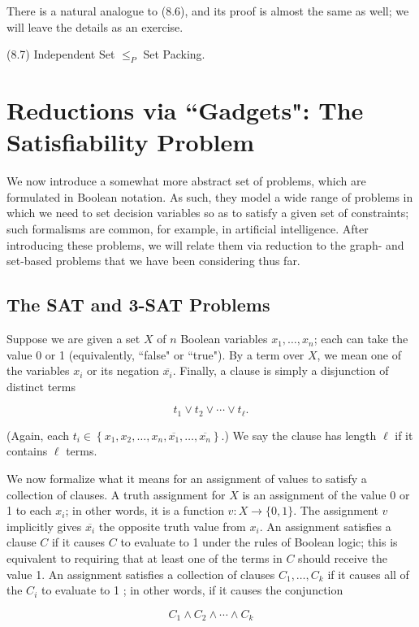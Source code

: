 \documentclass[a4paper, 12pt]{book}
\theoremstyle{dotless}
\begin{document}
There is a natural analogue to (8.6), and its proof is almost the same as well; we will leave the details as an exercise.

(8.7) Independent Set $\leq_{P}$ Set Packing.

\section{Reductions via ``Gadgets": The Satisfiability Problem}
We now introduce a somewhat more abstract set of problems, which are formulated in Boolean notation. As such, they model a wide range of problems in which we need to set decision variables so as to satisfy a given set of constraints; such formalisms are common, for example, in artificial intelligence. After introducing these problems, we will relate them via reduction to the graph- and set-based problems that we have been considering thus far.

\subsection{The SAT and 3-SAT Problems}
Suppose we are given a set $X$ of $n$ Boolean variables $x_{1}, \ldots, x_{n}$; each can take the value 0 or 1 (equivalently, ``false" or ``true"). By a term over $X$, we mean one of the variables $x_{i}$ or its negation $\overline{x_{i}}$. Finally, a clause is simply a disjunction of distinct terms

$$
t_{1} \vee t_{2} \vee \cdots \vee t_{\ell} .
$$

(Again, each $t_{i} \in\left\{x_{1}, x_{2}, \ldots, x_{n}, \overline{x_{1}}, \ldots, \overline{x_{n}}\right\}$.) We say the clause has length $\ell$ if it contains $\ell$ terms.

We now formalize what it means for an assignment of values to satisfy a collection of clauses. A truth assignment for $X$ is an assignment of the value 0 or 1 to each $x_{i}$; in other words, it is a function $v: X \rightarrow\{0,1\}$. The assignment $v$ implicitly gives $\overline{x_{i}}$ the opposite truth value from $x_{i}$. An assignment satisfies a clause $C$ if it causes $C$ to evaluate to 1 under the rules of Boolean logic; this is equivalent to requiring that at least one of the terms in $C$ should receive the value 1. An assignment satisfies a collection of clauses $C_{1}, \ldots, C_{k}$ if it causes all of the $C_{i}$ to evaluate to 1 ; in other words, if it causes the conjunction

$$
C_{1} \wedge C_{2} \wedge \cdots \wedge C_{k}
$$
\end{document}
